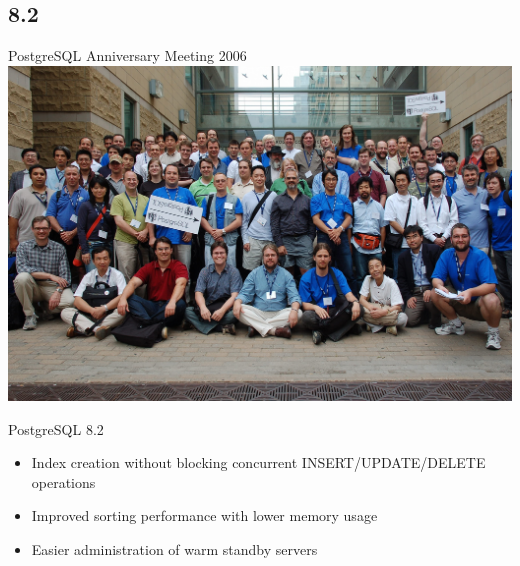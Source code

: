 \documentclass[t,10pt]{beamer}
\begin{document}
\subsection{8.2}
\begin{frame}{PostgreSQL Anniversary Meeting 2006}
  \includegraphics[width=\textwidth,keepaspectratio=true]{assets/2006-anniversary-group-oleg.jpg}
\end{frame}
\begin{frame}{PostgreSQL 8.2}
  \begin{itemize}%
  \item Index creation without blocking concurrent INSERT/UPDATE/DELETE operations
  \item Improved sorting performance with lower memory usage
  \item Easier administration of warm standby servers
  \end{itemize}
\end{frame}
\end{document}
